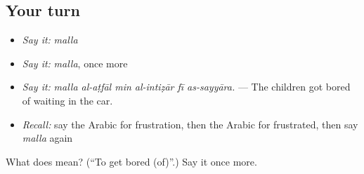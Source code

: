 \subsection*{Your turn}
\begin{itemize}
\raggedright
  \item \emph{Say it:} \emph{malla}
  \item \emph{Say it:} \emph{malla}, once more
  \item \emph{Say it:} \emph{malla al-aṭfāl min al-intiẓār fī as-sayyāra.} — The children got bored of waiting in the car.
  \item \emph{Recall:} say the Arabic for frustration, then the Arabic for frustrated, then say \emph{malla} again
\end{itemize}

\begin{tcolorbox}[breakable,colback=teal!4,colframe=teal!35!black,title={Before you move on}]
What does  mean? (\textquotedblleft{}To get bored (of)\textquotedblright{}.) Say it once more.
\end{tcolorbox}
